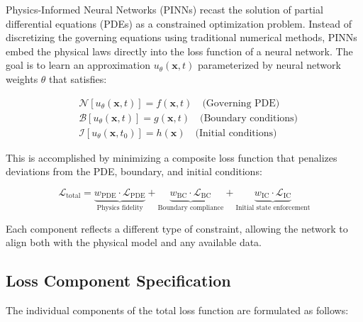 \documentclass[12pt]{article}
\begin{document}
Physics-Informed Neural Networks (PINNs) recast the solution of partial differential equations (PDEs) as a constrained optimization problem. Instead of discretizing the governing equations using traditional numerical methods, PINNs embed the physical laws directly into the loss function of a neural network. The goal is to learn an approximation $u_\theta(\mathbf{x}, t)$ parameterized by neural network weights $\theta$ that satisfies:

\begin{align}
    &\mathcal{N}[u_\theta(\mathbf{x}, t)] = f(\mathbf{x}, t) \quad \text{(Governing PDE)} \nonumber \\
    &\mathcal{B}[u_\theta(\mathbf{x}, t)] = g(\mathbf{x}, t) \quad \text{(Boundary conditions)} \nonumber \\
    &\mathcal{I}[u_\theta(\mathbf{x}, t_0)] = h(\mathbf{x}) \quad \text{(Initial conditions)} \nonumber
\end{align}

This is accomplished by minimizing a composite loss function that penalizes deviations from the PDE, boundary, and initial conditions:

\begin{equation}
    \mathcal{L}_{\text{total}} = 
    \underbrace{w_{\text{PDE}} \cdot \mathcal{L}_{\text{PDE}}}_{\text{Physics fidelity}} + 
    \underbrace{w_{\text{BC}} \cdot \mathcal{L}_{\text{BC}}}_{\text{Boundary compliance}} + 
    \underbrace{w_{\text{IC}} \cdot \mathcal{L}_{\text{IC}}}_{\text{Initial state enforcement}}
    \label{eq:total_loss}
\end{equation}

Each component reflects a different type of constraint, allowing the network to align both with the physical model and any available data.

\subsection{Loss Component Specification}

The individual components of the total loss function are formulated as follows:
\end{document}

